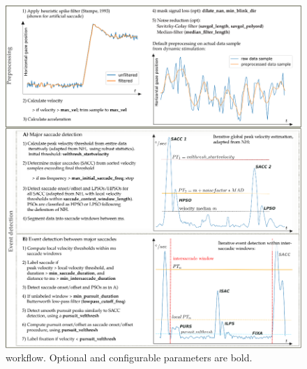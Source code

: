 %

\begin{figure}
	\includegraphics[width=1\textwidth]{img/remodnav_algorithm.eps}
	\caption{\remodnav workflow. Optional and configurable parameters are bold.}
	\label{fig:alg}
\end{figure}

